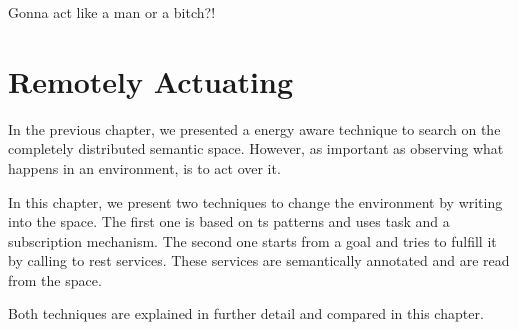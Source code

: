 

\begin{savequote}[50mm]
Gonna act like a man or a bitch?!
\end{savequote}


\chapter{Remotely Actuating}
\label{cha:actuate}
\newcommand{\pathchapfive}{5_actuate}


\ifpdf
    \graphicspath{{\pathchapfive/figures/PNG/}{\pathchapfive/figures/PDF/}{\pathchapfive/figures/}}
\else
    \graphicspath{{\pathchapfive/figures/EPS/}{\pathchapfive/figures/}}
\fi



In the previous chapter, we presented a energy aware technique to search on the completely distributed semantic space.
However, as important as observing what happens in an environment, is to act over it.

In this chapter, we present two techniques to change the environment by writing into the space.
The first one is based on \ac{ts} patterns and uses task and a subscription mechanism.
The second one starts from a goal and tries to fulfill it by calling to \ac{rest} services.
These services are semantically annotated and are read from the space.

Both techniques are explained in further detail and compared in this chapter.






